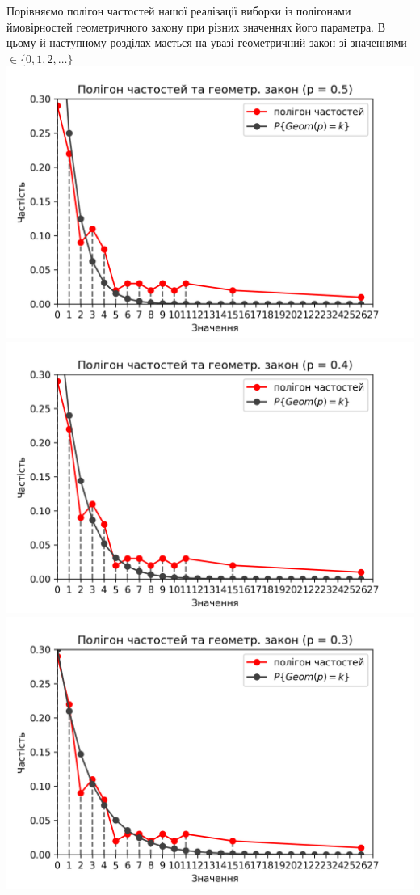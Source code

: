 \documentclass{article}
\begin{document}
\newpage
Порівняємо полігон частостей нашої реалізації 
виборки із полігонами ймовірностей геометричного закону при 
різних значеннях його параметра.
В цьому й наступному розділах мається на увазі геометричний закон
зі значеннями $ \in \{ 0, 1, 2, \dots \} $
\newline
\includegraphics[scale = 0.8]{plot1}
\newline
\includegraphics[scale = 0.8]{plot2}
\newline
\includegraphics[scale = 0.8]{plot3}
\end{document}
